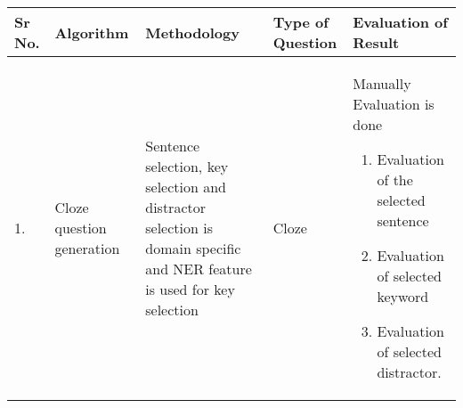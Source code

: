 \begin{center}
	\begin{longtable}{| p{0.6cm} | p{2.3cm} | p{4cm} | p{2cm} | p{5cm} |}
		\hline
		{\textbf{Sr No.}} & {\textbf{Algorithm}} & {\textbf{Methodology}} &
		{\textbf{Type of Question}} & {\textbf{Evaluation of Result}}\\[2ex]
		\hline
		1. &
		Cloze question generation &
		Sentence selection, key selection and distractor selection is
		domain specific and NER feature is used for key selection &
		Cloze &
		Manually Evaluation is done
		\begin{enumerate}
		\item Evaluation of the selected sentence
		\item Evaluation of selected keyword 
		\item Evaluation of selected distractor.
		\end{enumerate}
		\\[1ex]
		\hline


\end{longtable}
\end{center}
